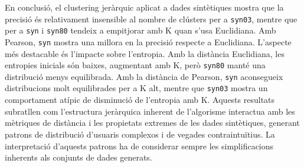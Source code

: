 \documentclass[a4paper,12pt]{report}
\begin{document}
En conclusió, el clustering jeràrquic aplicat a dades sintètiques mostra que la precisió és relativament insensible al nombre de clústers per a \texttt{syn03}, mentre que per a \texttt{syn} i \texttt{syn80} tendeix a empitjorar amb K quan s'usa Euclidiana. Amb Pearson, \texttt{syn} mostra una millora en la precisió respecte a Euclidiana. L'aspecte més destacable és l'impacte sobre l'entropia. Amb la distància Euclidiana, les entropies inicials són baixes, augmentant amb K, però \texttt{syn80} manté una distribució menys equilibrada. Amb la distància de Pearson, \texttt{syn} aconsegueix distribucions molt equilibrades per a K alt, mentre que \texttt{syn03} mostra un comportament atípic de disminució de l'entropia amb K. Aquests resultats subratllen com l'estructura jeràrquica inherent de l'algorisme interactua amb les mètriques de distància i les propietats extremes de les dades sintètiques, generant patrons de distribució d'usuaris complexos i de vegades contraintuïtius. La interpretació d'aquests patrons ha de considerar sempre les simplificacions inherents als conjunts de dades generats.
\end{document}
